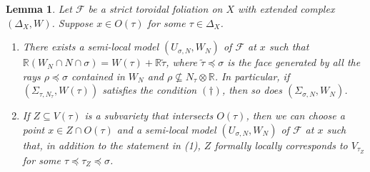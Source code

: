 \documentclass[12pt,reqno]{amsart}
\newtheorem{lemma}[theorem]{Lemma}
\theoremstyle{definition}
\newcommand\cF{{\mathcal{F}}}
\newcommand\bR{{\mathbb R}}
\begin{document}
\begin{lemma}\label{lem:exist_semi_local_model}
    Let $\cF$ be a strict toroidal foliation on $X$ with extended complex $(\Delta_X,W)$. Suppose $x\in O(\tau)$ for some $\tau\in\Delta_X$.
    \begin{enumerate}
        \item There exists a semi-local model $(U_{\sigma,N},W_N)$ of $\cF$ at $x$ such that $\bR(W_{N}\cap N\cap \sigma)=W(\tau)+\bR\tilde\tau$, where $\tilde\tau\preceq\sigma$ is the face generated by all the rays $\rho\preceq\sigma$ contained in $W_N$ and $\rho\nsubseteq N_\tau\otimes\bR$. In particular, if $(\Sigma_{\tau,N_\tau}, W(\tau))$ satisfies the condition $(\dagger)$, then so does $(\Sigma_{\sigma,N},W_N)$.

        \item If $Z\subseteq V(\tau)$ is a subvariety that intersects $O(\tau)$, then we can choose a point $x\in Z\cap O(\tau)$ and a semi-local model $(U_{\sigma,N},W_N)$ of $\cF$ at $x$ such that, in addition to the statement in (1), $Z$ formally locally corresponds to $V_{\tau_Z}$ for some $\tau\preceq\tau_Z\preceq \sigma$.
    \end{enumerate}
\end{lemma}
\end{document}
